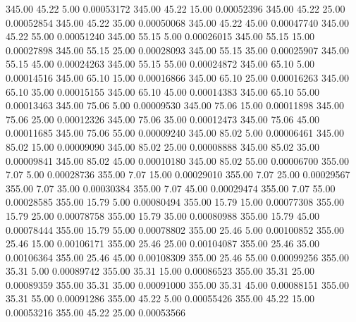     345.00     45.22      5.00     0.00053172
    345.00     45.22     15.00     0.00052396
    345.00     45.22     25.00     0.00052854
    345.00     45.22     35.00     0.00050068
    345.00     45.22     45.00     0.00047740
    345.00     45.22     55.00     0.00051240
    345.00     55.15      5.00     0.00026015
    345.00     55.15     15.00     0.00027898
    345.00     55.15     25.00     0.00028093
    345.00     55.15     35.00     0.00025907
    345.00     55.15     45.00     0.00024263
    345.00     55.15     55.00     0.00024872
    345.00     65.10      5.00     0.00014516
    345.00     65.10     15.00     0.00016866
    345.00     65.10     25.00     0.00016263
    345.00     65.10     35.00     0.00015155
    345.00     65.10     45.00     0.00014383
    345.00     65.10     55.00     0.00013463
    345.00     75.06      5.00     0.00009530
    345.00     75.06     15.00     0.00011898
    345.00     75.06     25.00     0.00012326
    345.00     75.06     35.00     0.00012473
    345.00     75.06     45.00     0.00011685
    345.00     75.06     55.00     0.00009240
    345.00     85.02      5.00     0.00006461
    345.00     85.02     15.00     0.00009090
    345.00     85.02     25.00     0.00008888
    345.00     85.02     35.00     0.00009841
    345.00     85.02     45.00     0.00010180
    345.00     85.02     55.00     0.00006700
    355.00      7.07      5.00     0.00028736
    355.00      7.07     15.00     0.00029010
    355.00      7.07     25.00     0.00029567
    355.00      7.07     35.00     0.00030384
    355.00      7.07     45.00     0.00029474
    355.00      7.07     55.00     0.00028585
    355.00     15.79      5.00     0.00080494
    355.00     15.79     15.00     0.00077308
    355.00     15.79     25.00     0.00078758
    355.00     15.79     35.00     0.00080988
    355.00     15.79     45.00     0.00078444
    355.00     15.79     55.00     0.00078802
    355.00     25.46      5.00     0.00100852
    355.00     25.46     15.00     0.00106171
    355.00     25.46     25.00     0.00104087
    355.00     25.46     35.00     0.00106364
    355.00     25.46     45.00     0.00108309
    355.00     25.46     55.00     0.00099256
    355.00     35.31      5.00     0.00089742
    355.00     35.31     15.00     0.00086523
    355.00     35.31     25.00     0.00089359
    355.00     35.31     35.00     0.00091000
    355.00     35.31     45.00     0.00088151
    355.00     35.31     55.00     0.00091286
    355.00     45.22      5.00     0.00055426
    355.00     45.22     15.00     0.00053216
    355.00     45.22     25.00     0.00053566
